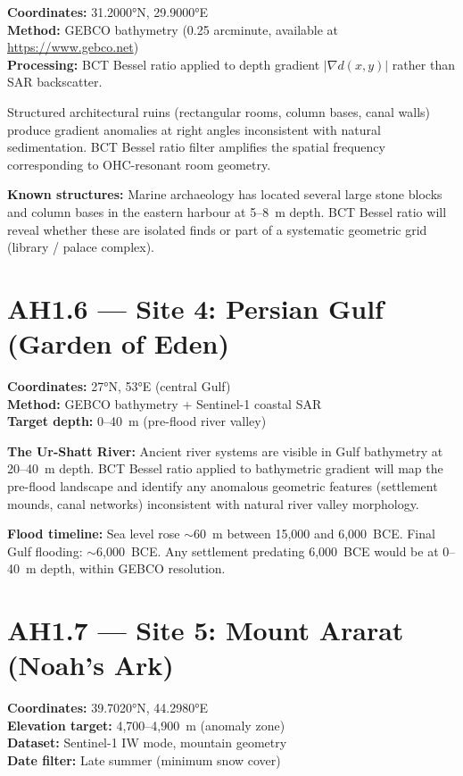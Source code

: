 \documentclass[12pt,twocolumn]{article}
\begin{document}
\textbf{Coordinates:} 31.2000°N, 29.9000°E\\
\textbf{Method:} GEBCO bathymetry (0.25 arcminute,
available at \url{https://www.gebco.net})\\
\textbf{Processing:} BCT Bessel ratio applied to depth
gradient $|\nabla d(x,y)|$ rather than SAR backscatter.

Structured architectural ruins (rectangular rooms, column
bases, canal walls) produce gradient anomalies at right
angles inconsistent with natural sedimentation. BCT Bessel
ratio filter amplifies the spatial frequency corresponding
to OHC-resonant room geometry.

\textbf{Known structures:} Marine archaeology has located
several large stone blocks and column bases in the eastern
harbour at 5--8~m depth. BCT Bessel ratio will reveal
whether these are isolated finds or part of a systematic
geometric grid (library / palace complex).

\section{AH1.6 --- Site 4: Persian Gulf (Garden of Eden)}

\textbf{Coordinates:} 27°N, 53°E (central Gulf)\\
\textbf{Method:} GEBCO bathymetry + Sentinel-1 coastal SAR\\
\textbf{Target depth:} 0--40~m (pre-flood river valley)

\textbf{The Ur-Shatt River:} Ancient river systems are
visible in Gulf bathymetry at 20--40~m depth. BCT Bessel
ratio applied to bathymetric gradient will map the
pre-flood landscape and identify any anomalous geometric
features (settlement mounds, canal networks) inconsistent
with natural river valley morphology.

\textbf{Flood timeline:} Sea level rose $\sim$60~m between
15,000 and 6,000~BCE. Final Gulf flooding: $\sim$6,000~BCE.
Any settlement predating 6,000~BCE would be at 0--40~m
depth, within GEBCO resolution.

\section{AH1.7 --- Site 5: Mount Ararat (Noah's Ark)}

\textbf{Coordinates:} 39.7020°N, 44.2980°E\\
\textbf{Elevation target:} 4,700--4,900~m (anomaly zone)\\
\textbf{Dataset:} Sentinel-1 IW mode, mountain geometry\\
\textbf{Date filter:} Late summer (minimum snow cover)
\end{document}
